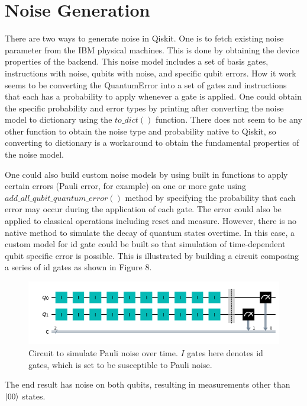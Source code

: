\documentclass{article}
\begin{document}
\section{Noise Generation}

There are two ways to generate noise in Qiskit. One is to fetch existing noise parameter from the IBM physical machines. This is done by obtaining the device properties of the backend. This noise model includes a set of basis gates, instructions with noise, qubits with noise, and specific qubit errors. How it work seems to be converting the QuantumError into a set of gates and instructions that each has a probability to apply whenever a gate is applied. One could obtain the specific probability and error types by printing after converting the noise model to dictionary using the $to\_dict()$ function. There does not seem to be any other function to obtain the noise type and probability native to Qiskit, so converting to dictionary is a workaround to obtain the fundamental properties of the noise model. 

One could also build custom noise models by using built in functions to apply certain errors (Pauli error, for example) on one or more gate using\newline
$add\_all\_qubit\_quantum\_error()$ method by specifying the probability that each error may occur during the application of each gate. The error could also be applied to classical operations including reset and measure. However, there is no native method to simulate the decay of quantum states overtime. In this case, a custom model for id gate could be built so that simulation of time-dependent qubit specific error is possible. This is illustrated by building a circuit composing a series of id gates as shown in Figure 8.

\begin{figure}[p]
    \centering
    \includegraphics[width = 0.8\linewidth]{noise/id.png}
    \caption{Circuit to simulate Pauli noise over time. $I$ gates here denotes id gates, which is set to be susceptible to Pauli noise.}
    \label{fig:my_label}
\end{figure}

The end result has noise on both qubits, resulting in measurements other than $\ket{00}$ states.
\end{document}
